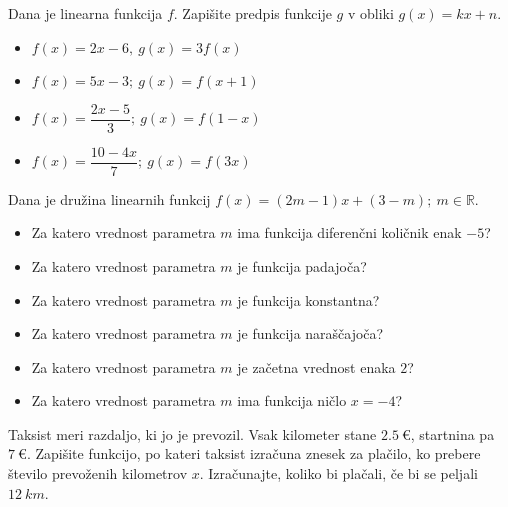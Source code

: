         
            \begin{naloga}
                Dana je linearna funkcija $f$. Zapišite predpis funkcije $g$ v obliki $g(x)=kx+n$.
                \begin{multicols}{2} 
                \begin{itemize}
                        \item $f(x)=2x-6, ~ g(x)=3f(x)$ 
                        \item $f(x)=5x-3; ~ g(x)=f(x+1)$ 
                        \item $f(x)=\dfrac{2x-5}{3}; ~ g(x)=f(1-x)$ 
                        \item $f(x)=\dfrac{10-4x}{7}; ~ g(x)=f(3x)$ 
                    \end{itemize}
                \end{multicols}
            \end{naloga}
        


        
            \begin{naloga}
                Dana je družina linearnih funkcij $f(x)=(2m-1)x+(3-m); ~m\in\mathbb{R}$.
                    \begin{itemize}
                        \item Za katero vrednost parametra $m$ ima funkcija diferenčni količnik enak $-5$? 
                        \item Za katero vrednost parametra $m$ je funkcija padajoča?
                        \item Za katero vrednost parametra $m$ je funkcija konstantna? 
                        \item Za katero vrednost parametra $m$ je funkcija naraščajoča? 
                        \item Za katero vrednost parametra $m$ je začetna vrednost enaka $2$? 
                        \item Za katero vrednost parametra $m$ ima funkcija ničlo $x=-4$? 
                    \end{itemize}
            \end{naloga}
        


        
            \begin{naloga}
                Taksist meri razdaljo, ki jo je prevozil. Vsak kilometer stane $2.5~€$, startnina pa $7~€$.
                Zapišite funkcijo, po kateri taksist izračuna znesek za plačilo, ko prebere število prevoženih kilometrov $x$. 
                Izračunajte, koliko bi plačali, če bi se peljali $12~km$. 
            \end{naloga}

